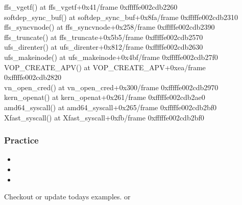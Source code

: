 \documentclass{beamer}
\begin{document}
\begin{frame}
{{{  ffs\_vgetf() at ffs\_vgetf+0x41/frame 0xfffffe002cdb2260\\
  softdep\_sync\_buf() at softdep\_sync\_buf+0x8fa/frame 0xfffffe002cdb2310\\
  ffs\_syncvnode() at ffs\_syncvnode+0x258/frame 0xfffffe002cdb2390\\
  ffs\_truncate() at ffs\_truncate+0x5b5/frame 0xfffffe002cdb2570\\
  ufs\_direnter() at ufs\_direnter+0x812/frame 0xfffffe002cdb2630\\
  ufs\_makeinode() at ufs\_makeinode+0x4bf/frame 0xfffffe002cdb27f0\\
  VOP\_CREATE\_APV() at VOP\_CREATE\_APV+0xea/frame 0xfffffe002cdb2820\\
  vn\_open\_cred() at vn\_open\_cred+0x300/frame 0xfffffe002cdb2970\\
  kern\_openat() at kern\_openat+0x261/frame 0xfffffe002cdb2ae0\\
  amd64\_syscall() at amd64\_syscall+0x265/frame 0xfffffe002cdb2bf0\\
  Xfast\_syscall() at Xfast\_syscall+0xfb/frame 0xfffffe002cdb2bf0\\
  }}
}
\end{frame}


\usebackgroundtemplate{}
\FootReferences{}{}
\begin{frame}
\frametitle{Practice}
  \begin{itemize}
    \item {}
    \item {}
    \item {}
  \end{itemize}
  Checkout or update todays examples.
  or
\end{frame}
\end{document}
